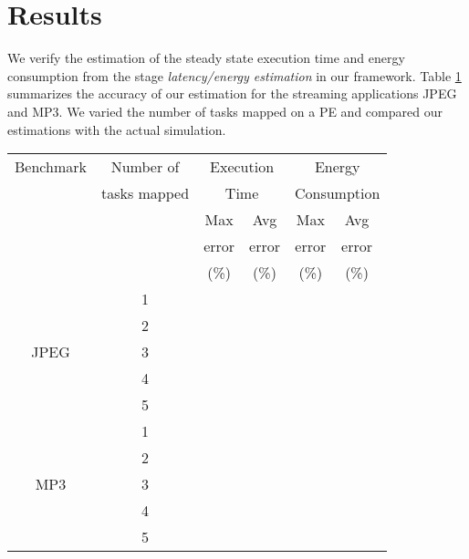 \section{Results}
We verify the estimation of the steady state execution time and energy consumption from the stage \textit{latency/energy estimation} in our framework. Table \ref{tab:est} summarizes the accuracy of our estimation for the streaming applications JPEG and MP3. We varied the number of tasks mapped on a PE and compared our estimations with the actual simulation. 

\begin{table}
{
\label{tab:est}
\begin{tabular}{|c|c|c|c|c|c|}
\hline
Benchmark &  Number of &\multicolumn{2}{|c}{Execution} & \multicolumn{2}{|c|}{Energy} \ \\
& tasks mapped & \multicolumn{2}{|c|}{Time}& \multicolumn{2}{|c|}{Consumption}\ \\
\hline
& & Max & Avg & Max & Avg\ \\
& & error & error & error & error\ \\
& & (\%) &  (\%) &  (\%) &  (\%)\ \\
\hline
\multirow{5}{*}{JPEG} &  1 & & & & \ \\
& 2 & & & & \\
& 3 & & & & \\
& 4 & & & & \\
& 5 & & & & \\
\hline
\multirow{5}{*}{MP3} &  1 & & & & \ \\
& 2 & & & & \\
& 3 & & & & \\
& 4 & & & & \\
& 5 & & & & \\
\hline
\end{tabular}
}
\end{table}

